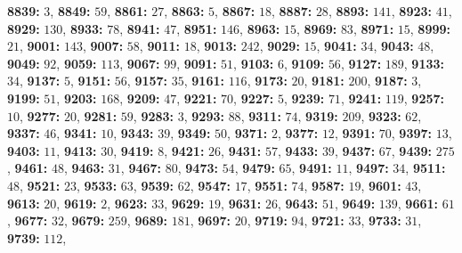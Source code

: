 \textsf{\bfseries 8839:} $3$, \textsf{\bfseries 8849:} $59$, \textsf{\bfseries 8861:} $27$, \textsf{\bfseries 8863:} $5$, \textsf{\bfseries 8867:} $18$, \textsf{\bfseries 8887:} $28$, \textsf{\bfseries 8893:} $141$, \textsf{\bfseries 8923:} $41$, \textsf{\bfseries 8929:} $130$, \textsf{\bfseries 8933:} $78$, \textsf{\bfseries 8941:} $47$, \textsf{\bfseries 8951:} $146$, \textsf{\bfseries 8963:} $15$, \textsf{\bfseries 8969:} $83$, \textsf{\bfseries 8971:} $15$, \textsf{\bfseries 8999:} $21$, \textsf{\bfseries 9001:} $143$, \textsf{\bfseries 9007:} $58$, \textsf{\bfseries 9011:} $18$, \textsf{\bfseries 9013:} $242$, \textsf{\bfseries 9029:} $15$, \textsf{\bfseries 9041:} $34$, \textsf{\bfseries 9043:} $48$, \textsf{\bfseries 9049:} $92$, \textsf{\bfseries 9059:} $113$, \textsf{\bfseries 9067:} $99$, \textsf{\bfseries 9091:} $51$, \textsf{\bfseries 9103:} $6$, \textsf{\bfseries 9109:} $56$, \textsf{\bfseries 9127:} $189$, \textsf{\bfseries 9133:} $34$, \textsf{\bfseries 9137:} $5$, \textsf{\bfseries 9151:} $56$, \textsf{\bfseries 9157:} $35$, \textsf{\bfseries 9161:} $116$, \textsf{\bfseries 9173:} $20$, \textsf{\bfseries 9181:} $200$, \textsf{\bfseries 9187:} $3$, \textsf{\bfseries 9199:} $51$, \textsf{\bfseries 9203:} $168$, \textsf{\bfseries 9209:} $47$, \textsf{\bfseries 9221:} $70$, \textsf{\bfseries 9227:} $5$, \textsf{\bfseries 9239:} $71$, \textsf{\bfseries 9241:} $119$, \textsf{\bfseries 9257:} $10$, \textsf{\bfseries 9277:} $20$, \textsf{\bfseries 9281:} $59$, \textsf{\bfseries 9283:} $3$, \textsf{\bfseries 9293:} $88$, \textsf{\bfseries 9311:} $74$, \textsf{\bfseries 9319:} $209$, \textsf{\bfseries 9323:} $62$, \textsf{\bfseries 9337:} $46$, \textsf{\bfseries 9341:} $10$, \textsf{\bfseries 9343:} $39$, \textsf{\bfseries 9349:} $50$, \textsf{\bfseries 9371:} $2$, \textsf{\bfseries 9377:} $12$, \textsf{\bfseries 9391:} $70$, \textsf{\bfseries 9397:} $13$, \textsf{\bfseries 9403:} $11$, \textsf{\bfseries 9413:} $30$, \textsf{\bfseries 9419:} $8$, \textsf{\bfseries 9421:} $26$, \textsf{\bfseries 9431:} $57$, \textsf{\bfseries 9433:} $39$, \textsf{\bfseries 9437:} $67$, \textsf{\bfseries 9439:} $275$, \textsf{\bfseries 9461:} $48$, \textsf{\bfseries 9463:} $31$, \textsf{\bfseries 9467:} $80$, \textsf{\bfseries 9473:} $54$, \textsf{\bfseries 9479:} $65$, \textsf{\bfseries 9491:} $11$, \textsf{\bfseries 9497:} $34$, \textsf{\bfseries 9511:} $48$, \textsf{\bfseries 9521:} $23$, \textsf{\bfseries 9533:} $63$, \textsf{\bfseries 9539:} $62$, \textsf{\bfseries 9547:} $17$, \textsf{\bfseries 9551:} $74$, \textsf{\bfseries 9587:} $19$, \textsf{\bfseries 9601:} $43$, \textsf{\bfseries 9613:} $20$, \textsf{\bfseries 9619:} $2$, \textsf{\bfseries 9623:} $33$, \textsf{\bfseries 9629:} $19$, \textsf{\bfseries 9631:} $26$, \textsf{\bfseries 9643:} $51$, \textsf{\bfseries 9649:} $139$, \textsf{\bfseries 9661:} $61$, \textsf{\bfseries 9677:} $32$, \textsf{\bfseries 9679:} $259$, \textsf{\bfseries 9689:} $181$, \textsf{\bfseries 9697:} $20$, \textsf{\bfseries 9719:} $94$, \textsf{\bfseries 9721:} $33$, \textsf{\bfseries 9733:} $31$, \textsf{\bfseries 9739:} $112$, 
